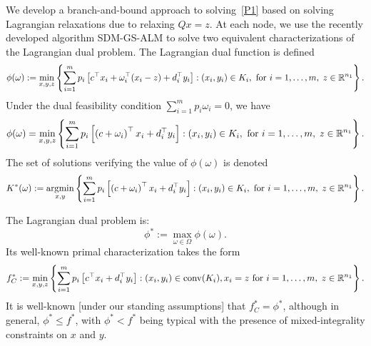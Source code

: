 We develop a branch-and-bound approach to solving~\eqref{P1} based on solving Lagrangian relaxations due to relaxing $Qx=z$.
At each node, we use the recently developed algorithm SDM-GS-ALM to solve two equivalent characterizations of the Lagrangian dual problem.
The Lagrangian dual function is defined 
$$\phi(\omega) := \min_{x,y,z} \left\{ \sum_{i=1}^m p_i \left[ c^\top x_i + \omega_i^\top(x_i-z) + d_i^\top y_i \right] : (x_i,y_i) \in K_i,\text{ for }i=1,\dots,m,\; z \in \mathbb{R}^{n_1} \right \}.$$ 
Under the dual feasibility condition $\sum_{i=1}^m p_i \omega_i = 0$, we have 
$$\phi(\omega) = \min_{x,y,z} \left\{ \sum_{i=1}^m p_i \left[ \left(c+\omega_i\right)^\top x_i + d_i^\top y_i \right] : (x_i,y_i) \in K_i, \text{ for }i=1,\dots,m,\;z \in \mathbb{R}^{n_1} \right \}.$$ 
The set of solutions verifying the value of $\phi(\omega)$ is denoted
$$
K^*(\omega):=\operatorname*{argmin}_{x,y} \left\{ \sum_{i=1}^m p_i \left[ \left(c+\omega_i\right)^\top x_i + d_i^\top y_i \right] : (x_i,y_i) \in K_i, \text{ for }i=1,\dots,m,\; z \in \mathbb{R}^{n_1} \right \}.
$$



The Lagrangian dual problem is:
\begin{equation}\label{D1}
\phi^*:=\max_{\omega \in \Omega} \phi(\omega).
\end{equation}
Its well-known primal characterization takes the form
\begin{equation}\label{D2}
f_C^*:=\min_{x,y,z} \left\{ \sum_{i=1}^m p_i \left[ c^\top x_i + d_i^\top y_i \right] : (x_i,y_i) \in \operatorname{conv}(K_i),  x_i=z \text{ for }i=1,\dots,m,\; z \in \mathbb{R}^{n_1} \right \}.
\end{equation}
It is well-known [under our standing assumptions] that $f_C^*=\phi^*$, although in general, $\phi^* \le f^*$, with $\phi^* < f^*$ being typical with the presence of mixed-integrality constraints on $x$ and $y$.


